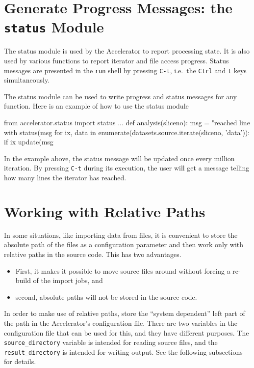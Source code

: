 \section{Generate Progress Messages:  the \texttt{status} Module}
\label{sec:statusreporting}
The status module is used by the Accelerator to report processing
state.  It is also used by various functions to report iterator and
file access progress.  Status messages are presented in
the \texttt{run} shell by pressing \texttt{C-t}, i.e.\
the \texttt{Ctrl} and \texttt{t} keys simultaneously.

The status module can be used to write progress and status messages
for any function.  Here is an example of how to use the status module
\begin{python}
from accelerator.status import status
...
def analysis(sliceno):
    msg = "reached line %
    with status(msg %
        for ix, data in enumerate(datasets.source.iterate(sliceno, 'data')):
            if ix %
                update(msg %
\end{python}
In the example above, the status message will be updated once every
million iteration.  By pressing \texttt{C-t} during its execution, the
user will get a message telling how many lines the iterator has
reached.



\section{Working with Relative Paths}
In some situations, like importing data from files, it is convenient
to store the absolute path of the files as a configuration parameter
and then work only with relative paths in the source code.  This has
two advantages.
\begin{itemize}
\item[] First, it makes it possible to move source files around without
forcing a re-build of the import jobs, and
\item[] second, absolute paths will not be stored in the source code.
\end{itemize}
In order to make use of relative paths, store the ``system dependent''
left part of the path in the Accelerator's configuration file.  There
are two variables in the configuration file that can be used for this,
and they have different purposes.  The \texttt{source\_directory}
variable is intended for reading source files, and
the \texttt{result\_directory} is intended for writing output.  See
the following subsections for details.


